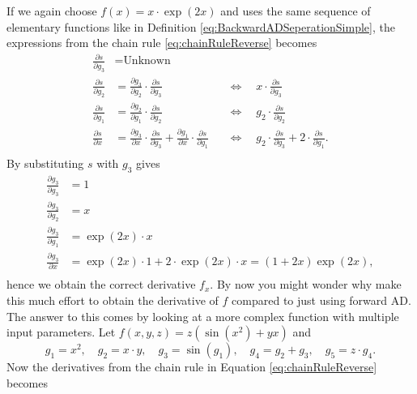 If we again choose  $f(x) = x\cdot\exp(2x)$ and uses the same sequence of elementary functions like in Definition \eqref{eq:BackwardADSeperationSimple}, the expressions from the chain rule \eqref{eq:chainRuleReverse} becomes
\begin{align*}
    \frac{\partial s}{\partial g_3} &= \text{Unknown}\\
    \frac{\partial s}{\partial g_2} &= \frac{\partial g_3}{\partial g_2} \cdot \frac{\partial s}{\partial g_3} &&\Longleftrightarrow \quad x\cdot \frac{\partial s}{\partial g_3} \\
    \frac{\partial s}{\partial g_1} &= \frac{\partial g_2}{\partial g_1}\cdot \frac{\partial s}{\partial g_2} &&\Longleftrightarrow \quad g_2 \cdot \frac{\partial s}{\partial g_2} \\
    \frac{\partial s}{\partial x} &= \frac{\partial g_3}{\partial x}\cdot \frac{\partial s}{\partial g_3} + \frac{\partial g_1}{\partial x}\cdot \frac{\partial s}{\partial g_1} && \Longleftrightarrow \quad g_2\cdot \frac{\partial s}{\partial g_3} + 2\cdot \frac{\partial s}{\partial g_1}.\\
\end{align*}
By substituting $s$ with $g_3$ gives
\begin{align*}
    \frac{\partial g_3}{\partial g_3} &= 1\\
    \frac{\partial g_3}{\partial g_2} &= x\\
    \frac{\partial g_3}{\partial g_1} &= \exp(2x)\cdot x\\
    \frac{\partial g_3}{\partial x} &= \exp(2x)\cdot 1 + 2\cdot\exp(2x)\cdot x = (1 + 2x)\exp(2x),\\
\end{align*}
hence we obtain the correct derivative $f_x$. By now you might wonder why make this much effort to obtain the derivative of $f$ compared to just using forward AD. The answer to this comes by looking at a more complex function with multiple input parameters. Let $f(x,y,z) = z(\sin(x^2)+yx)$ and 
\begin{equation}
    g_1 = x^2, \quad g_2 = x\cdot y, \quad g_3 = \sin(g_1), \quad g_4 = g_2 + g_3, \quad g_5 = z\cdot g_4.
    \label{eq:DependencyBackwardAD}
\end{equation}
Now the derivatives from the chain rule in Equation \eqref{eq:chainRuleReverse} becomes \\
